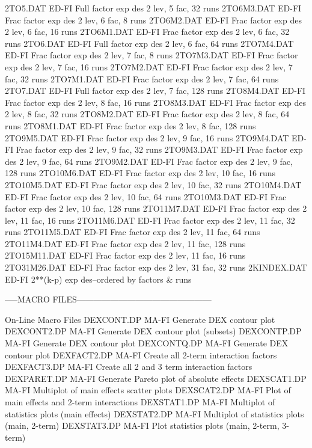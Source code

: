 2TO5.DAT                    ED-FI Full factor exp des 2 lev,  5 fac,  32 runs
2TO6M3.DAT                  ED-FI Frac factor exp des 2 lev,  6 fac,   8 runs
2TO6M2.DAT                  ED-FI Frac factor exp des 2 lev,  6 fac,  16 runs
2TO6M1.DAT                  ED-FI Frac factor exp des 2 lev,  6 fac,  32 runs
2TO6.DAT                    ED-FI Full factor exp des 2 lev,  6 fac,  64 runs
2TO7M4.DAT                  ED-FI Frac factor exp des 2 lev,  7 fac,   8 runs
2TO7M3.DAT                  ED-FI Frac factor exp des 2 lev,  7 fac,  16 runs
2TO7M2.DAT                  ED-FI Frac factor exp des 2 lev,  7 fac,  32 runs
2TO7M1.DAT                  ED-FI Frac factor exp des 2 lev,  7 fac,  64 runs
2TO7.DAT                    ED-FI Full factor exp des 2 lev,  7 fac, 128 runs
2TO8M4.DAT                  ED-FI Frac factor exp des 2 lev,  8 fac,  16 runs
2TO8M3.DAT                  ED-FI Frac factor exp des 2 lev,  8 fac,  32 runs
2TO8M2.DAT                  ED-FI Frac factor exp des 2 lev,  8 fac,  64 runs
2TO8M1.DAT                  ED-FI Frac factor exp des 2 lev,  8 fac, 128 runs
2TO9M5.DAT                  ED-FI Frac factor exp des 2 lev,  9 fac,  16 runs
2TO9M4.DAT                  ED-FI Frac factor exp des 2 lev,  9 fac,  32 runs
2TO9M3.DAT                  ED-FI Frac factor exp des 2 lev,  9 fac,  64 runs
2TO9M2.DAT                  ED-FI Frac factor exp des 2 lev,  9 fac, 128 runs
2TO10M6.DAT                 ED-FI Frac factor exp des 2 lev, 10 fac,  16 runs
2TO10M5.DAT                 ED-FI Frac factor exp des 2 lev, 10 fac,  32 runs
2TO10M4.DAT                 ED-FI Frac factor exp des 2 lev, 10 fac,  64 runs
2TO10M3.DAT                 ED-FI Frac factor exp des 2 lev, 10 fac, 128 runs
2TO11M7.DAT                 ED-FI Frac factor exp des 2 lev, 11 fac,  16 runs
2TO11M6.DAT                 ED-FI Frac factor exp des 2 lev, 11 fac,  32 runs
2TO11M5.DAT                 ED-FI Frac factor exp des 2 lev, 11 fac,  64 runs
2TO11M4.DAT                 ED-FI Frac factor exp des 2 lev, 11 fac, 128 runs
2TO15M11.DAT                ED-FI Frac factor exp des 2 lev, 11 fac,  16 runs
2TO31M26.DAT                ED-FI Frac factor exp des 2 lev, 31 fac,  32 runs
2KINDEX.DAT                 ED-FI 2**(k-p) exp des--ordered by factors & runs

-----MACRO FILES------------------------------------------------

On-Line Macro Files
DEXCONT.DP                  MA-FI Generate DEX contour plot
DEXCONT2.DP                 MA-FI Generate DEX contour plot (subsets)
DEXCONTP.DP                 MA-FI Generate DEX contour plot
DEXCONTQ.DP                 MA-FI Generate DEX contour plot
DEXFACT2.DP                 MA-FI Create all 2-term interaction factors
DEXFACT3.DP                 MA-FI Create all 2 and 3 term interaction factors
DEXPARET.DP                 MA-FI Generate Pareto plot of absolute effects
DEXSCAT1.DP                 MA-FI Multiplot of main effects scatter plots
DEXSCAT2.DP                 MA-FI Plot of main effects and 2-term interactions
DEXSTAT1.DP                 MA-FI Multiplot of statistics plots (main effects)
DEXSTAT2.DP                 MA-FI Multiplot of statistics plots (main, 2-term)
DEXSTAT3.DP                 MA-FI Plot statistics plots (main, 2-term, 3-term)

